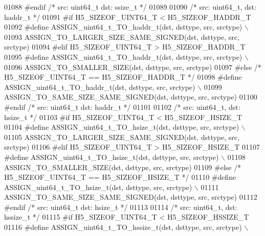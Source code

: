 \begin{DoxyCode}
01088 \textcolor{preprocessor}{#endif }\textcolor{comment}{/* src: uint64\_t dst: ssize\_t */}\textcolor{preprocessor}{}
01089 
01090 \textcolor{comment}{/* src: uint64\_t, dst: haddr\_t */}
01091 \textcolor{preprocessor}{#if H5\_SIZEOF\_UINT64\_T < H5\_SIZEOF\_HADDR\_T}
01092 \textcolor{preprocessor}{    #define ASSIGN\_uint64\_t\_TO\_haddr\_t(dst, dsttype, src, srctype) \(\backslash\)}
01093 \textcolor{preprocessor}{        ASSIGN\_TO\_LARGER\_SIZE\_SAME\_SIGNED(dst, dsttype, src, srctype)}
01094 \textcolor{preprocessor}{#elif H5\_SIZEOF\_UINT64\_T > H5\_SIZEOF\_HADDR\_T}
01095 \textcolor{preprocessor}{    #define ASSIGN\_uint64\_t\_TO\_haddr\_t(dst, dsttype, src, srctype) \(\backslash\)}
01096 \textcolor{preprocessor}{        ASSIGN\_TO\_SMALLER\_SIZE(dst, dsttype, src, srctype)}
01097 \textcolor{preprocessor}{#else }\textcolor{comment}{/* H5\_SIZEOF\_UINT64\_T == H5\_SIZEOF\_HADDR\_T */}\textcolor{preprocessor}{}
01098 \textcolor{preprocessor}{    #define ASSIGN\_uint64\_t\_TO\_haddr\_t(dst, dsttype, src, srctype) \(\backslash\)}
01099 \textcolor{preprocessor}{        ASSIGN\_TO\_SAME\_SIZE\_SAME\_SIGNED(dst, dsttype, src, srctype)}
01100 \textcolor{preprocessor}{#endif }\textcolor{comment}{/* src: uint64\_t dst: haddr\_t */}\textcolor{preprocessor}{}
01101 
01102 \textcolor{comment}{/* src: uint64\_t, dst: hsize\_t */}
01103 \textcolor{preprocessor}{#if H5\_SIZEOF\_UINT64\_T < H5\_SIZEOF\_HSIZE\_T}
01104 \textcolor{preprocessor}{    #define ASSIGN\_uint64\_t\_TO\_hsize\_t(dst, dsttype, src, srctype) \(\backslash\)}
01105 \textcolor{preprocessor}{        ASSIGN\_TO\_LARGER\_SIZE\_SAME\_SIGNED(dst, dsttype, src, srctype)}
01106 \textcolor{preprocessor}{#elif H5\_SIZEOF\_UINT64\_T > H5\_SIZEOF\_HSIZE\_T}
01107 \textcolor{preprocessor}{    #define ASSIGN\_uint64\_t\_TO\_hsize\_t(dst, dsttype, src, srctype) \(\backslash\)}
01108 \textcolor{preprocessor}{        ASSIGN\_TO\_SMALLER\_SIZE(dst, dsttype, src, srctype)}
01109 \textcolor{preprocessor}{#else }\textcolor{comment}{/* H5\_SIZEOF\_UINT64\_T == H5\_SIZEOF\_HSIZE\_T */}\textcolor{preprocessor}{}
01110 \textcolor{preprocessor}{    #define ASSIGN\_uint64\_t\_TO\_hsize\_t(dst, dsttype, src, srctype) \(\backslash\)}
01111 \textcolor{preprocessor}{        ASSIGN\_TO\_SAME\_SIZE\_SAME\_SIGNED(dst, dsttype, src, srctype)}
01112 \textcolor{preprocessor}{#endif }\textcolor{comment}{/* src: uint64\_t dst: hsize\_t */}\textcolor{preprocessor}{}
01113 
01114 \textcolor{comment}{/* src: uint64\_t, dst: hssize\_t */}
01115 \textcolor{preprocessor}{#if H5\_SIZEOF\_UINT64\_T < H5\_SIZEOF\_HSSIZE\_T}
01116 \textcolor{preprocessor}{    #define ASSIGN\_uint64\_t\_TO\_hssize\_t(dst, dsttype, src, srctype) \(\backslash\)}

\end{DoxyCode}
